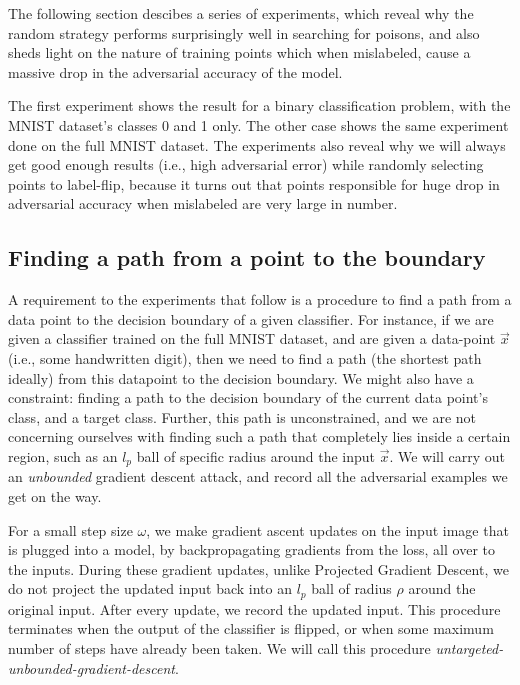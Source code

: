 \documentclass[12pt, oneside]{book}
\begin{document}
The following section descibes a series of experiments, which reveal why the
random strategy performs surprisingly well in searching for poisons, and also
sheds light on the nature of training points which when mislabeled, cause a
massive drop in the adversarial accuracy of the model.

The first experiment shows the result for a binary classification problem, with
the MNIST dataset's classes 0 and 1 only. The other case shows the same
experiment done on the full MNIST dataset. The experiments also reveal why we
will always get good enough results (i.e., high adversarial error) while
randomly selecting points to label-flip, because it turns out that points
responsible for huge drop in adversarial accuracy when mislabeled are very large
in number.

\subsection{Finding a path from a point to the boundary}

A requirement to the experiments that follow is a procedure to find a path from
a data point to the decision boundary of a given classifier. For instance, if we
are given a classifier trained on the full MNIST dataset, and are given a
data-point $\vec{x}$ (i.e., some handwritten digit), then we need to find a path
(the shortest path ideally) from this datapoint to the decision boundary. We
might also have a constraint: finding a path to the decision boundary of the
current data point's class, and a target class. Further, this path is
unconstrained, and we are not concerning ourselves with finding such a path that
completely lies inside a certain region, such as an $l_p$ ball of specific
radius around the input $\vec{x}$. We will carry out an \emph{unbounded}
gradient descent attack, and record all the adversarial examples we get on the
way.

For a small step size $\omega$, we make gradient ascent updates on the input
image that is plugged into a model, by backpropagating gradients from the loss,
all over to the inputs. During these gradient updates, unlike Projected Gradient
Descent, we do not project the updated input back into an $l_p$ ball of radius
$\rho$ around the original input. After every update, we record the updated
input. This procedure terminates when the output of the classifier is flipped,
or when some maximum number of steps have already been taken. We will call this
procedure \emph{untargeted-unbounded-gradient-descent}.
\end{document}

